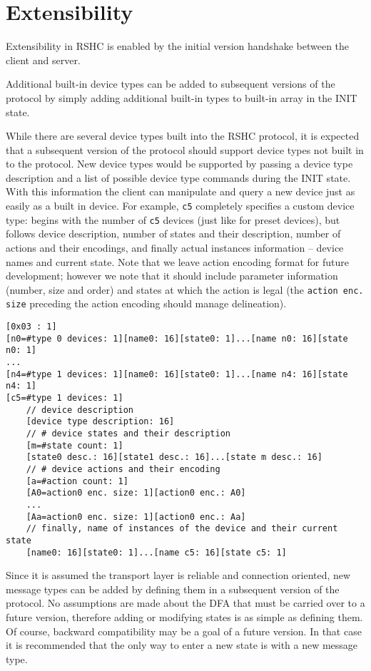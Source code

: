 \section{Extensibility}
\label{sec:extend}

Extensibility in RSHC is enabled by the initial version handshake between the client and server.

Additional built-in device types can be added to subsequent versions of the protocol by simply adding additional built-in types to built-in array in the INIT state.

While there are several device types built into the RSHC protocol, it is expected that a subsequent version of the protocol should support device types not built in to the protocol.  New device types would be supported by passing a device type description and a list of possible device type commands during the INIT state.  With this information the client can manipulate and query a new device just as easily as a built in device.  For example, {\tt c5} completely specifies a custom device type: begins with the number of {\tt c5} devices (just like for preset devices), but follows device description, number of states and their description, number of actions and their encodings, and finally actual instances information -- device names and current state. Note that we leave action encoding format for future development; however we note that it should include parameter information (number, size and order) and states at which the action is legal (the {\tt action enc. size} preceding the action encoding should manage delineation).

\begin{verbatim}
[0x03 : 1]
[n0=#type 0 devices: 1][name0: 16][state0: 1]...[name n0: 16][state n0: 1]
...
[n4=#type 1 devices: 1][name0: 16][state0: 1]...[name n4: 16][state n4: 1]
[c5=#type 1 devices: 1]
    // device description
    [device type description: 16]
    // # device states and their description
    [m=#state count: 1]
    [state0 desc.: 16][state1 desc.: 16]...[state m desc.: 16]
    // # device actions and their encoding
    [a=#action count: 1]
    [A0=action0 enc. size: 1][action0 enc.: A0]
    ...
    [Aa=action0 enc. size: 1][action0 enc.: Aa]
    // finally, name of instances of the device and their current state
    [name0: 16][state0: 1]...[name c5: 16][state c5: 1]
\end{verbatim}

Since it is assumed the transport layer is reliable and connection oriented, new message types can be added by defining them in a subsequent version of the protocol.  No assumptions are made about the DFA that must be carried over to a future version, therefore adding or modifying states is as simple as defining them.  Of course, backward compatibility may be a goal of a future version.  In that case it is recommended that the only way to enter a new state is with a new message type.


